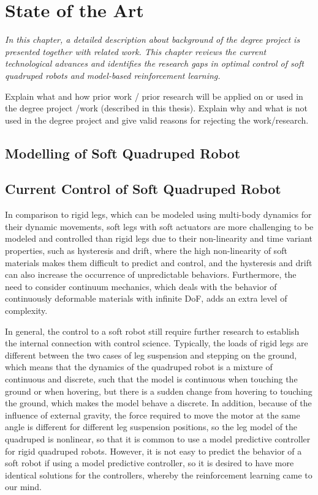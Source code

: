 \chapter{State of the Art}
\textit{In this chapter, a detailed description about background of the degree project is presented together with related work. This chapter reviews the current technological advances and identifies the research gaps in optimal control of soft quadruped robots and model-based reinforcement learning.}

Explain what and how prior work / prior research will be applied on or used in the degree project /work (described in this thesis). Explain why and what is not used in the degree project and give valid reasons for rejecting the work/research.
\section{Modelling of Soft Quadruped Robot}

\section{Current Control of Soft Quadruped Robot}
 In comparison to rigid legs, which can be modeled using multi-body dynamics for their dynamic movements, soft legs with soft actuators are more challenging to be modeled and controlled than rigid legs due to their non-linearity\cite{slotineAppliedNonlinearControl1991} and time variant properties\cite{wangControlStrategiesSoft2022}, such as hysteresis and drift, where the high non-linearity of soft materials makes them difficult to predict and control, and the hysteresis and drift can also increase the occurrence of unpredictable behaviors. Furthermore, the need to consider continuum mechanics, which deals with the behavior of continuously deformable materials with infinite \ac{DoF}\cite{polygerinosSoftRoboticsReview2017}, adds an extra level of complexity. 

In general, the control to a soft robot still require further research to establish the internal connection with control science\cite{wangControlStrategiesSoft2022}. Typically, the loads of rigid legs are different between the two cases of leg suspension and stepping on the ground\cite{biswalDevelopmentQuadrupedWalking2021}, which means that the dynamics of the quadruped robot is a mixture of continuous and discrete, such that the model is continuous when touching the ground or when hovering, but there is a sudden change from hovering to touching the ground, which makes the model behave a discrete. In addition, because of the influence of external gravity, the force required to move the motor at the same angle is different for different leg suspension positions, so the leg model of the quadruped is nonlinear, so that it is common to use a model predictive controller for rigid quadruped robots. However, it is not easy to predict the behavior of a soft robot if using a model predictive controller\cite{BemporadLinearTimevaryingNonlinearMPC}, so it is desired to have more identical solutions for the controllers, whereby the  reinforcement learning came to our mind\cite{hewingLearningbasedModelPredictive2020}. 

